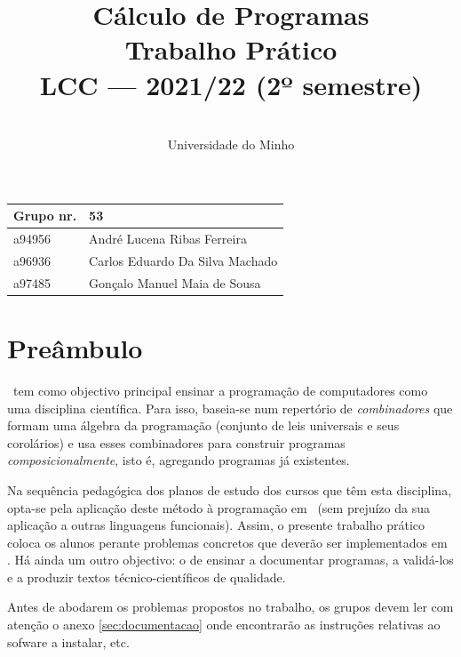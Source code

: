\documentclass[a4paper]{article}
\title{
          Cálculo de Programas
\\
          Trabalho Prático
\\
          LCC --- 2021/22 (2º semestre)
}
\author{
          \dium
\\
          Universidade do Minho
}
\date\mydate
\begin{document}
\maketitle

\begin{center}\large
\begin{tabular}{ll}
\textbf{Grupo} nr. & 53
\\\hline
a94956 & André Lucena Ribas Ferreira
\\
a96936 & Carlos Eduardo Da Silva Machado
\\
a97485 & Gonçalo Manuel Maia de Sousa
\end{tabular}
\end{center}

\section{Preâmbulo}

\CP\ tem como objectivo principal ensinar
a progra\-mação de computadores como uma disciplina científica. Para isso,
baseia-se num repertório de \emph{combinadores} que formam uma álgebra da
programação (conjunto de leis universais e seus corolários) e usa esses
combinadores para construir programas \emph{composicionalmente}, isto é,
agregando programas já existentes.

Na sequência pedagógica dos planos de estudo dos cursos que têm
esta disciplina, opta-se pela aplicação deste método à programação
em \Haskell\ (sem prejuízo da sua aplicação a outras linguagens
funcionais). Assim, o presente trabalho prático coloca os
alunos perante problemas concretos que deverão ser implementados em
\Haskell.  Há ainda um outro objectivo: o de ensinar a documentar
programas, a validá-los e a produzir textos técnico-científicos de
qualidade.

Antes de abodarem os problemas propostos no trabalho, os grupos devem ler
com atenção o anexo \ref{sec:documentacao} onde encontrarão as instruções
relativas ao sofware a instalar, etc.


\Problema
\end{document}
